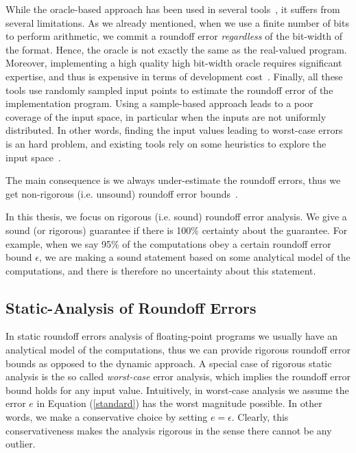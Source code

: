 While the oracle-based approach has been used in several tools~\cite{landau2014guide, kahan1996improbability, atomic, blame, herbie}, it suffers from several limitations.
%
As we already mentioned, when we use a finite number of bits to perform arithmetic, we commit a roundoff error \emph{regardless} of the bit-width of the format.
%
Hence, the oracle is not exactly the same as the real-valued program.
%
%
Moreover, implementing a high quality high bit-width oracle requires significant expertise, and thus is expensive in terms of development cost~\cite{atomic}.
%
Finally, all these tools use randomly sampled input points to estimate the roundoff error of the implementation program.
%
Using a sample-based approach leads to a poor coverage of the input space, in particular when the inputs are not uniformly distributed.
%
In other words, finding the input values leading to worst-case errors is an hard problem, and existing tools rely on some heuristics to explore the input space~\cite{dynamic}. 
%

%
The main consequence is we always under-estimate the roundoff errors, thus we get non-rigorous (i.e. unsound) roundoff error bounds~\cite{glasserman2013monte, parker2000monte, herbie}.
%

In this thesis, we focus on rigorous (i.e. sound) roundoff error analysis.
%
We give a sound (or rigorous) guarantee if there is 100\% certainty about the guarantee.
%
%
For example, when we say 95\% of the computations obey a certain roundoff error bound $\epsilon$, we are making a sound statement based on some analytical model of the computations, and there is therefore no uncertainty about this statement.
%
%
\subsection{Static-Analysis of Roundoff Errors}
\label{sec:worst}
%
In static roundoff errors analysis of floating-point programs we usually have an analytical model of the computations, thus we can provide rigorous roundoff error bounds as opposed to the dynamic approach.
%
A special case of rigorous static analysis is the so called \emph{worst-case} error analysis, which implies the roundoff error bound holds for any input value.
%
Intuitively, in worst-case analysis we assume the error $e$ in Equation (\ref{standard}) has the worst magnitude possible. In other words, we make a conservative choice by setting $e=\epsilon$.
%
Clearly, this conservativeness makes the analysis rigorous in the sense there cannot be any outlier.
%

